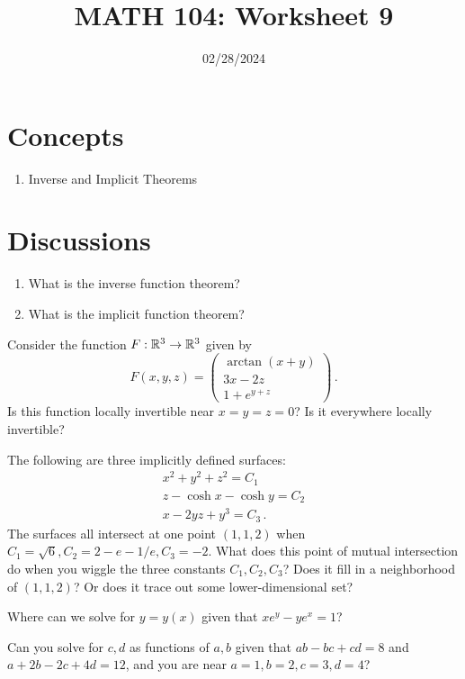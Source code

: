 \documentclass[12pt]{amsart}
\title{ MATH 104: Worksheet 9}
\author{}
\date{02/28/2024}
\begin{document}
\maketitle

\section{Concepts}

\begin{enumerate}
    \item Inverse and Implicit Theorems 
\end{enumerate}

\section{Discussions}

\begin{question}
    \begin{enumerate}
        \item What is the inverse function theorem?
        \item What is the implicit function theorem?
    \end{enumerate}
\end{question}

\begin{question}
    Consider the function $F:\mathbb{R}^3 \to \mathbb{R}^3$ given by
    $$ F(x,y,z) = \begin{pmatrix}
        \arctan (x + y) \\
        3x - 2z \\
        1 + e^{y+z}
    \end{pmatrix} \,.$$
    Is this function locally invertible near $x = y = z = 0$?
    Is it everywhere locally invertible?
\end{question}

\begin{question}[Difficult]
    The following are three implicitly defined surfaces:
    \begin{align*}
        x^2 + y^2 + z^2 = C_1 \\
        z - \cosh x - \cosh y = C_2 \\
        x - 2yz + y^3 = C_3 \,.
    \end{align*}
    The surfaces all intersect at one point $(1,1,2)$ when $C_1 = \sqrt{6}, C_2 = 2 - e - 1/e, 
    C_3 = -2$.
    What does this point of mutual intersection do when you wiggle the three constants $C_1, C_2, C_3$?
    Does it fill in a neighborhood of $(1,1,2)$? Or does it trace out some lower-dimensional set?
\end{question}

\begin{question}
    Where can we solve for $y = y(x)$ given that
    $x e^y - y e^x = 1$?
\end{question}

\begin{question}
    Can you solve for $c,d$ as functions of $a,b$ given that 
    $ ab - bc + cd = 8 $ and $a + 2b -2c +4d = 12$,
    and you are near $a = 1, b = 2, c = 3, d = 4$?
\end{question}
\end{document}
